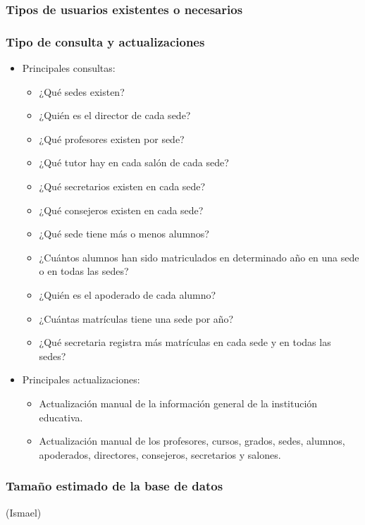 \subsubsection{Tipos de usuarios existentes o necesarios}
\subsubsection{Tipo de consulta y actualizaciones}
\begin{itemize}
	\item Principales consultas:
	      \begin{itemize}
		      \item ¿Qué sedes existen?
		      \item ¿Quién es el director de cada sede?
		      \item ¿Qué profesores existen por sede?
		      \item ¿Qué tutor hay en cada salón de cada sede?
		      \item ¿Qué secretarios existen en cada sede?
		      \item ¿Qué consejeros existen en cada sede?
		      \item ¿Qué sede tiene más o menos alumnos?
		      \item ¿Cuántos alumnos han sido matriculados en determinado año en una sede o en todas las sedes?
		      \item ¿Quién es el apoderado de cada alumno?
		      \item ¿Cuántas matrículas tiene una sede por año?
		      \item ¿Qué secretaria registra más matrículas en cada sede y en todas las sedes?
	      \end{itemize}
	\item Principales actualizaciones:
	      \begin{itemize}
		      \item Actualización manual de la información general de la institución educativa.
		      \item Actualización manual de los profesores, cursos, grados, sedes, alumnos, apoderados, directores, consejeros, secretarios y salones.
	      \end{itemize}
\end{itemize}
\subsubsection{Tamaño estimado de la base de datos} (Ismael)
